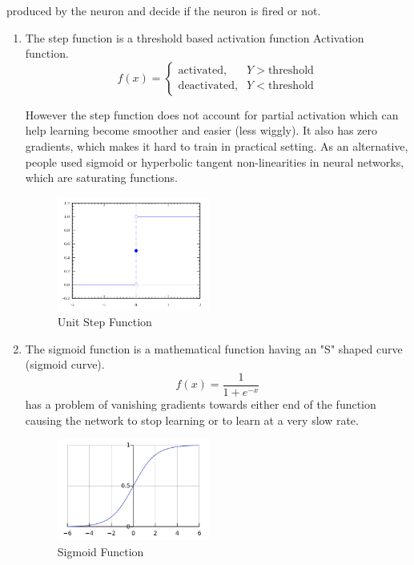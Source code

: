produced by the neuron and decide if the neuron is fired or not. 
\begin{enumerate}[label=(\alph*)]
\item The step function is a threshold based activation function Activation function. 
\begin{equation}
    f(x)=\begin{cases}
            \text{activated}, & Y > \text{threshold} \\
            \text{deactivated}, & Y < \text{threshold}
        \end{cases}
\end{equation}

However the step function does not account for partial activation which can help learning become smoother and easier (less wiggly). It also has zero gradients, which makes it hard to train in practical setting. As an alternative, people used sigmoid or hyperbolic tangent non-linearities in neural networks, which are saturating functions. 
\begin{figure}[ht]
\centering
\includegraphics[width=50mm]{figs/step_function.png}
\caption{Unit Step Function}
\label{fig:step_function}
\end{figure}

\item The sigmoid function is a mathematical function having an "S" shaped curve (sigmoid curve).
\begin{equation}
    f(x) = \frac{1}{1+e^{-x}}
\end{equation}
has a problem of vanishing gradients towards either end of the function causing the network to stop learning or to learn at a very slow rate.

\begin{figure}[ht]
\centering
\includegraphics[width=50mm]{figs/sigmoid_function.png}
\caption{Sigmoid Function}
\label{fig:sigmoid}
\end{figure}


\end{enumerate}
